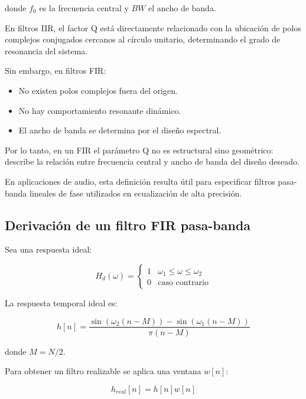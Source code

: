 \documentclass[a4,11pt]{article}
\begin{document}
donde $f_0$ es la frecuencia central y $BW$ el ancho de banda.

En filtros IIR, el factor Q está directamente relacionado con la ubicación de polos complejos conjugados cercanos al círculo unitario, determinando el grado de resonancia del sistema.

Sin embargo, en filtros FIR:

\begin{itemize}
\item No existen polos complejos fuera del origen.
\item No hay comportamiento resonante dinámico.
\item El ancho de banda se determina por el diseño espectral.
\end{itemize}

Por lo tanto, en un FIR el parámetro Q no es estructural sino geométrico: describe la relación entre frecuencia central y ancho de banda del diseño deseado.

En aplicaciones de audio, esta definición resulta útil para especificar filtros pasa-banda lineales de fase utilizados en ecualización de alta precisión.

\subsection{Derivación de un filtro FIR pasa-banda}
\label{subsec:derivacion_fir}

Sea una respuesta ideal:

\begin{equation}
H_d(\omega)=
\begin{cases}
1 & \omega_1 \le \omega \le \omega_2 \\
0 & \text{caso contrario}
\end{cases}
\label{eq:respuesta_ideal}
\end{equation}

La respuesta temporal ideal es:

\begin{equation}
h[n] = \frac{\sin(\omega_2(n-M)) - \sin(\omega_1(n-M))}{\pi (n-M)}
\label{eq:respuesta_impulso_ideal}
\end{equation}

donde $M=N/2$.

Para obtener un filtro realizable se aplica una ventana $w[n]$:

\begin{equation}
h_{real}[n] = h[n] w[n]
\label{eq:ventaneo}
\end{equation}
\end{document}

